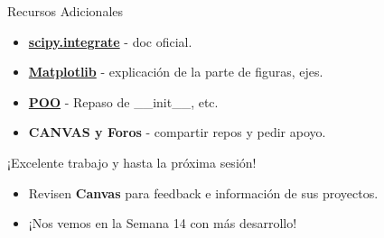 \documentclass[10pt]{beamer}
\begin{document}
\begin{frame}{Recursos Adicionales}
  \begin{itemize}
    \item \href{https://docs.scipy.org/doc/scipy/reference/integrate.html}{\textbf{scipy.integrate}} - doc oficial.
    \item \href{https://matplotlib.org/3.3.0/tutorials/introductory/lifecycle.html}{\textbf{Matplotlib}} - explicación de la parte de figuras, ejes.
    \item \href{https://docs.python.org/3/tutorial/classes.html}{\textbf{POO}} - Repaso de \_\_init\_\_, etc.
    \item \textbf{CANVAS y Foros} - compartir repos y pedir apoyo.
  \end{itemize}
\end{frame}

\begin{frame}
  \Huge{\centerline{¡Excelente trabajo y hasta la próxima sesión!}}
  \vspace{0.5cm}
  \normalsize
  \begin{itemize}
    \item Revisen \textbf{Canvas} para feedback e información de sus proyectos.
    \item ¡Nos vemos en la Semana 14 con más desarrollo!
  \end{itemize}
\end{frame}
\end{document}
